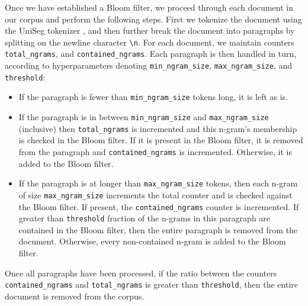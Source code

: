\documentclass{article}
\begin{document}
Once we have established a Bloom filter, we proceed through each document in our corpus and perform the following steps. First we tokenize the document using the UniSeg tokenizer \citep{uniseg}, and then further break the document into paragraphs by splitting on the newline character \texttt{\textbackslash n}. For each document, we maintain counters \texttt{total\_ngrams}, and \texttt{contained\_ngrams}. Each paragraph is then handled in turn, according to hyperparameters denoting \texttt{min\_ngram\_size}, \texttt{max\_ngram\_size}, and \texttt{threshold}:
\begin{itemize}
\item If the paragraph is fewer than \texttt{min\_ngram\_size} tokens long, it is left as is.
\item If the paragraph is in between \texttt{min\_ngram\_size} and \texttt{max\_ngram\_size} (inclusive) then \texttt{total\_ngrams} is incremented and this n-gram's membership is checked in the Bloom filter. If it is present in the Bloom filter, it is removed from the paragraph and \texttt{contained\_ngrams} is incremented. Otherwise, it is added to the Bloom filter.
\item If the paragraph is at longer than \texttt{max\_ngram\_size} tokens, then each n-gram of size \texttt{max\_ngram\_size} increments the total counter and is checked against the Bloom filter. If present, the \texttt{contained\_ngrams} counter is incremented. If greater than \texttt{threshold} fraction of the n-grams in this paragraph are contained in the Bloom filter, then the entire paragraph is removed from the document. Otherwise, every non-contained n-gram is added to the Bloom filter.
\end{itemize}
Once all paragraphs have been processed, if the ratio between the counters \texttt{contained\_ngrams} and \texttt{total\_ngrams} is greater than \texttt{threshold}, then the entire document is removed from the corpus.
\end{document}
